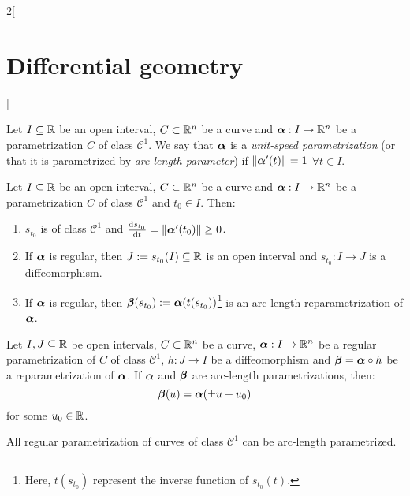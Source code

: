 \documentclass[../../../main.tex]{subfiles}
\begin{document}
\begin{multicols}{2}[\section{Differential geometry}]
\begin{definition}
    Let $I\subseteq\mathbb{R}$ be an open interval, $C\subset\mathbb{R}^n$ be a curve and $\boldsymbol{\mathrm{\alpha}}:I\rightarrow\mathbb{R}^n$ be a parametrization $C$ of class $\mathcal{C}^1$. We say that $\boldsymbol{\mathrm{\alpha}}$ is a \emph{unit-speed parametrization} (or that it is parametrized by \emph{arc-length parameter}) if $\|\boldsymbol{\mathrm{\alpha}}'(t)\|=1$ $\forall t\in I$.
  \end{definition}
  \begin{proposition}
    Let $I\subseteq\mathbb{R}$ be an open interval, $C\subset\mathbb{R}^n$ be a curve and $\boldsymbol{\mathrm{\alpha}}:I\rightarrow\mathbb{R}^n$ be a parametrization $C$ of class $\mathcal{C}^1$ and ${t_0}\in I$. Then:
    \begin{enumerate}
      \item $s_{t_0}$ is of class $\mathcal{C}^1$ and $\dv{s_{t_0}}{t}(t_0)=\|\boldsymbol{\mathrm{\alpha}}'(t_0)\|\geq 0$.
      \item If $\boldsymbol{\mathrm{\alpha}}$ is regular, then $J:=s_{t_0}(I)\subseteq\mathbb{R}$ is an open interval and $s_{t_0}:I\rightarrow J$ is a diffeomorphism.
      \item If $\boldsymbol{\mathrm{\alpha}}$ is regular, then $\boldsymbol{\mathrm{\beta}}(s_{t_0}):=\boldsymbol{\mathrm{\alpha}}(t(s_{t_0}))$\footnote{Here, $t(s_{t_0})$ represent the inverse function of $s_{t_0}(t)$.} is an arc-length reparametrization of $\boldsymbol{\mathrm{\alpha}}$.
    \end{enumerate}
  \end{proposition}
  \begin{proposition}
    Let $I,J\subseteq\mathbb{R}$ be open intervals, $C\subset\mathbb{R}^n$ be a curve, $\boldsymbol{\mathrm{\alpha}}:I\rightarrow\mathbb{R}^n$ be a regular parametrization of $C$ of class $\mathcal{C}^1$, $h:J\rightarrow I$ be a diffeomorphism and $\boldsymbol{\mathrm{\beta}}=\boldsymbol{\mathrm{\alpha}}\circ h$ be a reparametrization of $\boldsymbol{\mathrm{\alpha}}$. If $\boldsymbol{\mathrm{\alpha}}$ and $\boldsymbol{\mathrm{\beta}}$ are arc-length parametrizations, then: $$\boldsymbol{\mathrm{\beta}}(u)=\boldsymbol{\mathrm{\alpha}}(\pm u+u_0)$$ for some $u_0\in\mathbb{R}$.
  \end{proposition}
  \begin{proposition}
    All regular parametrization of curves of class $\mathcal{C}^1$ can be arc-length parametrized.
  \end{proposition}

\end{multicols}
\end{document}
